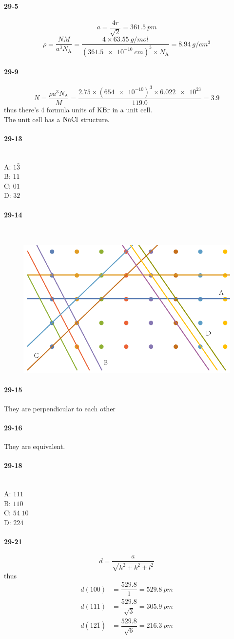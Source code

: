 \documentclass[a4paper]{article}
\newcommand{\NA}{N_\mathrm{A}}
\newcommand{\ex}[1]{\paragraph{29-#1}}
\numberwithin{equation}{section}
\begin{document}
\ex{5}
\begin{equation}\label{key}
a = \dfrac{4r}{\sqrt{2}} = \SI{361.5}{pm}
\end{equation}
\begin{equation}\label{key}
\rho = \dfrac{NM}{a^3\NA} = \dfrac{4\times \SI{63.55}{g/mol}}{(\SI{361.5e-10}{cm})^3\times \NA} = \SI{8.94}{g/cm^3}
\end{equation}

\ex{9}
\begin{equation}\label{key}
N = \dfrac{\rho a^3 \NA}{M} = \dfrac{2.75 \times (\num{654e-10})^3 \times \num{6.022e23}}{119.0} = 3.9
\end{equation}
thus there's 4 formula units of $ \ce{KBr} $ in a unit cell.\\
The unit cell has a $ \ce{NaCl} $ structure.


\ex{13}~\\
A: $ 1\bar{3} $\\
B: $ 11 $\\
C: $ 01 $\\
D: $ 32 $\\

\ex{14}~\\
\begin{figure}[H]
	\centering
	\includegraphics[width=0.8\linewidth]{29-14.pdf}
\end{figure}

\ex{15}
They are perpendicular to each other

\ex{16}
They are equivalent.

\ex{18}~\\
A: $ 111 $\\
B: $ 110 $\\
C: $ 54\; 10 $\\
D: $ 22\bar{4} $\\

\ex{21}
\begin{equation}\label{key}
d = \dfrac{a}{\sqrt{h^2 + k^2 + l^2}}
\end{equation}
thus
\begin{align}
d(100) &= \dfrac{529.8}{1} = \SI{529.8}{pm}\\
d(111) &= \dfrac{529.8}{\sqrt{3}} = \SI{305.9}{pm}\\
d(12\bar{1}) &= \dfrac{529.8}{\sqrt{6}} = \SI{216.3}{pm}
\end{align}
\end{document}
